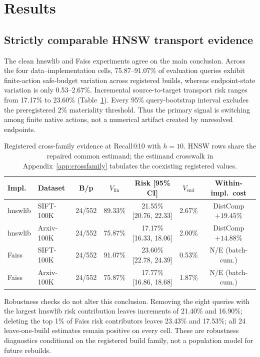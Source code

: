 \documentclass{article}
\begin{document}
\section{Results}
\label{sec:results}

\subsection{Strictly comparable HNSW transport evidence}

The clean hnswlib and Faiss experiments agree on the main conclusion. Across the four data--implementation
cells, 75.87--91.07\% of evaluation queries exhibit finite-action safe-budget variation across registered
builds, whereas endpoint-state variation is only 0.53--2.67\%. Incremental source-to-target transport risk
ranges from 17.17\% to 23.60\% (Table~\ref{tab:crossfamily}). Every 95\% query-bootstrap interval excludes
the preregistered 2\% materiality threshold. Thus the primary signal is switching among finite native
actions, not a numerical artifact created by unresolved endpoints.

\begin{table}[t]
\centering
\caption{Registered cross-family evidence at Recall@10 with $h{=}10$. HNSW rows share the repaired common
estimand; the estimand crosswalk in Appendix~\ref{app:crossfamily} tabulates the coexisting registered
values.}
\label{tab:crossfamily}
\footnotesize
\setlength{\tabcolsep}{2.6pt}
\begin{tabular}{llccccc}
\toprule
Impl. & Dataset & B/p & $V_{\mathrm{fin}}$ & Risk [95\% CI] & $V_{\mathrm{end}}$ & Within-impl.\ cost \\
\midrule
hnswlib & SIFT-100K & 24/552 & 89.33\% & 21.55\% {\tiny[20.76, 22.33]} & 2.67\% & DistComp $+19.45\%$ \\
hnswlib & Arxiv-100K & 24/552 & 75.87\% & 17.17\% {\tiny[16.33, 18.06]} & 2.00\% & DistComp $+14.88\%$ \\
Faiss & SIFT-100K & 24/552 & 91.07\% & 23.60\% {\tiny[22.78, 24.39]} & 0.53\% & N/E (batch-cum.) \\
Faiss & Arxiv-100K & 24/552 & 75.87\% & 17.77\% {\tiny[16.86, 18.68]} & 1.87\% & N/E (batch-cum.) \\
\bottomrule
\end{tabular}
\end{table}

Robustness checks do not alter this conclusion. Removing the eight queries with the largest hnswlib risk
contribution leaves increments of 21.40\% and 16.90\%; deleting the top 1\% of Faiss risk contributors
leaves 23.43\% and 17.53\%; all 24 leave-one-build estimates remain positive on every cell. These are
robustness diagnostics conditional on the registered build family, not a population model for future
rebuilds.
\end{document}
